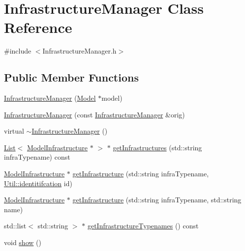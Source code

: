 \hypertarget{class_infrastructure_manager}{\section{Infrastructure\-Manager Class Reference}
\label{class_infrastructure_manager}
}


{\ttfamily \#include $<$Infrastructure\-Manager.\-h$>$}

\subsection*{Public Member Functions}
\begin{DoxyCompactItemize}
\item 
\hyperlink{class_infrastructure_manager_a65067e32d70b63c7b0b46c61dcab6a22}{Infrastructure\-Manager} (\hyperlink{class_model}{Model} $\ast$model)
\item 
\hyperlink{class_infrastructure_manager_a091a712dc18339f9ea350519af229dba}{Infrastructure\-Manager} (const \hyperlink{class_infrastructure_manager}{Infrastructure\-Manager} \&orig)
\item 
virtual \hyperlink{class_infrastructure_manager_a5bca34aaf33a39c649ad3a1a9cd0ebf9}{$\sim$\-Infrastructure\-Manager} ()
\item 
\hyperlink{class_list}{List}$<$ \hyperlink{class_model_infrastructure}{Model\-Infrastructure} $\ast$ $>$ $\ast$ \hyperlink{class_infrastructure_manager_a1d013b55994e27cac0c45c1ad08f74e0}{get\-Infrastructures} (std\-::string infra\-Typename) const 
\item 
\hyperlink{class_model_infrastructure}{Model\-Infrastructure} $\ast$ \hyperlink{class_infrastructure_manager_a2c957eee5107d521e8292cb6f8e9ea5b}{get\-Infrastructure} (std\-::string infra\-Typename, \hyperlink{class_util_ad17d458d9344b10bba64347e514d6d71}{Util\-::identitifcation} id)
\item 
\hyperlink{class_model_infrastructure}{Model\-Infrastructure} $\ast$ \hyperlink{class_infrastructure_manager_ab8663cae44cd58387391c1821c48beb7}{get\-Infrastructure} (std\-::string infra\-Typename, std\-::string name)
\item 
std\-::list$<$ std\-::string $>$ $\ast$ \hyperlink{class_infrastructure_manager_aaf3ff8d9288b333d21a202caae797bc7}{get\-Infrastructure\-Typenames} () const 
\item 
void \hyperlink{class_infrastructure_manager_a8e10fe1a6a40ce020b1b63232dbb05cd}{show} ()
\end{DoxyCompactItemize}


